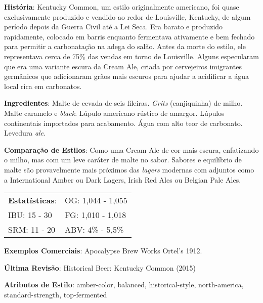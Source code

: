 \textbf{História}: Kentucky Common, um estilo originalmente americano, foi quase exclusivamente produzido e vendido ao redor de Louisville, Kentucky, de algum período depois da Guerra Civil até a Lei Seca. Era barato e produzido rapidamente, colocado em barris enquanto fermentava ativamente e bem fechado para permitir a carbonatação na adega do salão. Antes da morte do estilo, ele representava cerca de 75\% das vendas em torno de Louisville. Alguns especularam que era uma variante escura da Cream Ale, criada por cervejeiros imigrantes germânicos que adicionaram grãos mais escuros para ajudar a acidificar a água local rica em carbonatos.

\textbf{Ingredientes}: Malte de cevada de seis fileiras. \textit{Grits} (canjiquinha) de milho. Malte caramelo e \textit{black}. Lúpulo americano rústico de amargor. Lúpulos continentais importados para acabamento. Água com alto teor de carbonato. Levedura \textit{ale}.

\textbf{Comparação de Estilos}: Como uma Cream Ale de cor mais escura, enfatizando o milho, mas com um leve caráter de malte no sabor. Sabores e equilíbrio de malte são provavelmente mais próximos das \textit{lagers} modernas com adjuntos como a International Amber ou Dark Lagers, Irish Red Ales ou Belgian Pale Ales.

\begin{tabular}{@{}p{35mm}p{35mm}@{}}
  \textbf{Estatísticas}: & OG: 1,044 - 1,055  \\
  IBU: 15 - 30  & FG: 1,010 - 1,018  \\
  SRM: 11 - 20 & ABV: 4\% - 5,5\%
\end{tabular}

\textbf{Exemplos Comerciais}: Apocalypse Brew Works Ortel's 1912.

\textbf{Última Revisão}: Historical Beer: Kentucky Common (2015)

\textbf{Atributos de Estilo}: amber-color, balanced, historical-style, north-america, standard-strength, top-fermented

